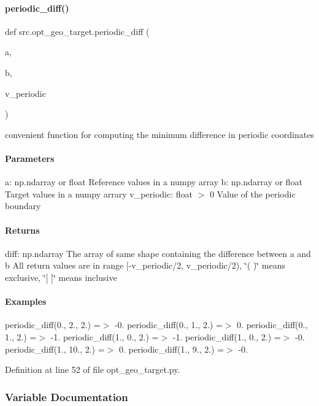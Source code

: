 \paragraph{\texorpdfstring{periodic\+\_\+diff()}{periodic\_diff()}}
{\footnotesize\ttfamily def src.\+opt\+\_\+geo\+\_\+target.\+periodic\+\_\+diff (\begin{DoxyParamCaption}\item[{}]{a,  }\item[{}]{b,  }\item[{}]{v\+\_\+periodic }\end{DoxyParamCaption})}



convenient function for computing the minimum difference in periodic coordinates \paragraph*{Parameters }

a\+: np.\+ndarray or float Reference values in a numpy array b\+: np.\+ndarray or float Target values in a numpy arrary v\+\_\+periodic\+: float $>$ 0 Value of the periodic boundary 

\paragraph*{Returns }

diff\+: np.\+ndarray The array of same shape containing the difference between a and b All return values are in range \mbox{[}-\/v\+\_\+periodic/2, v\+\_\+periodic/2), \char`\"{}( )\char`\"{} means exclusive, \char`\"{}\mbox{[} \mbox{]}\char`\"{} means inclusive

\paragraph*{Examples }

periodic\+\_\+diff(0., 2., 2.) =$>$ -\/0. periodic\+\_\+diff(0., 1., 2.) =$>$ 0. periodic\+\_\+diff(0., 1., 2.) =$>$ -\/1. periodic\+\_\+diff(1., 0., 2.) =$>$ -\/1. periodic\+\_\+diff(1., 0., 2.) =$>$ -\/0. periodic\+\_\+diff(1., 10., 2.) =$>$ 0. periodic\+\_\+diff(1., 9., 2.) =$>$ -\/0. 

Definition at line 52 of file opt\+\_\+geo\+\_\+target.\+py.



\subsubsection{Variable Documentation}
\mbox{\label{namespacesrc_1_1opt__geo__target_a02a9cc0378ce93c64c05f75bfc9f8ef9}} 
